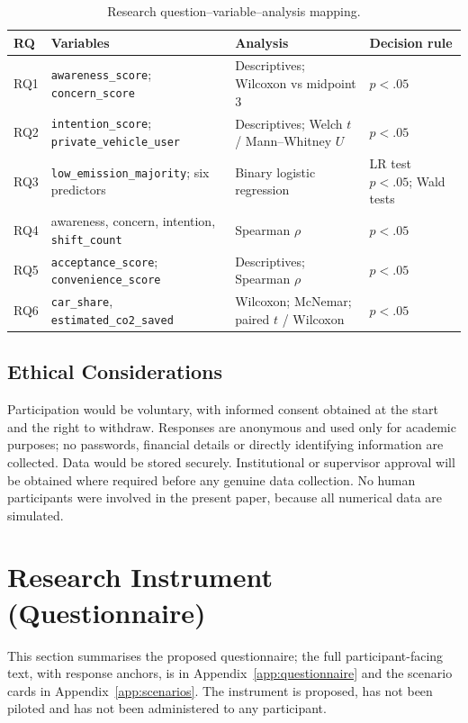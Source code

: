 \documentclass[11pt,a4paper]{article}
\newcommand{\code}[1]{\texttt{#1}}
\begin{document}
\begin{table}[H]
\centering
\small
\caption{Research question--variable--analysis mapping.}
\label{tab:rqmap}
\begin{tabular}{@{}p{1.0cm}p{4.6cm}p{4.0cm}p{4.4cm}@{}}
\toprule
\textbf{RQ} & \textbf{Variables} & \textbf{Analysis} & \textbf{Decision rule}\\
\midrule
RQ1 & \code{awareness\_score}; \code{concern\_score} & Descriptives; Wilcoxon vs midpoint 3 & $p < .05$\\
RQ2 & \code{intention\_score}; \code{private\_vehicle\_user} & Descriptives; Welch $t$ / Mann--Whitney $U$ & $p < .05$\\
RQ3 & \code{low\_emission\_majority}; six predictors & Binary logistic regression & LR test $p < .05$; Wald tests\\
RQ4 & awareness, concern, intention, \code{shift\_count} & Spearman $\rho$ & $p < .05$\\
RQ5 & \code{acceptance\_score}; \code{convenience\_score} & Descriptives; Spearman $\rho$ & $p < .05$\\
RQ6 & \code{car\_share}, \code{estimated\_co2\_saved} & Wilcoxon; McNemar; paired $t$ / Wilcoxon & $p < .05$\\
\bottomrule
\end{tabular}
\end{table}

\subsection{Ethical Considerations}
Participation would be voluntary, with informed consent obtained at the start and the right to
withdraw. Responses are anonymous and used only for academic purposes; no passwords, financial
details or directly identifying information are collected. Data would be stored securely.
Institutional or supervisor approval will be obtained where required before any genuine data
collection. No human participants were involved in the present paper, because all numerical data are
simulated.

\section{Research Instrument (Questionnaire)}
This section summarises the proposed questionnaire; the full participant-facing text, with response
anchors, is in Appendix~\ref{app:questionnaire} and the scenario cards in
Appendix~\ref{app:scenarios}. The instrument is proposed, has not been piloted and has not been
administered to any participant.
\end{document}
